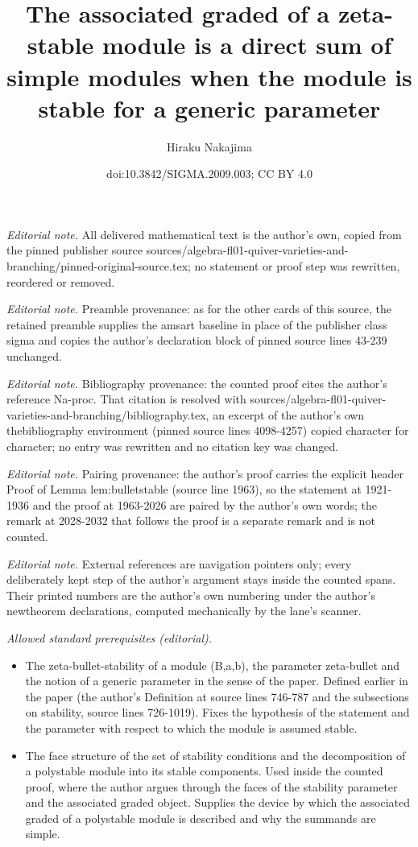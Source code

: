 \documentclass[10pt,a4paper]{amsart}
\title{The associated graded of a zeta-stable module is a direct sum of simple modules when the module is stable for a generic parameter}
\author{Hiraku Nakajima}
\date{doi:10.3842/SIGMA.2009.003; CC BY 4.0}
\theoremstyle{definition}
\numberwithin{equation}{section}
\begin{document}
\maketitle
\noindent\textit{Editorial note.} All delivered mathematical text is the author's own, copied from the pinned publisher source sources/algebra-fl01-quiver-varieties-and-branching/pinned-original-source.tex; no statement or proof step was rewritten, reordered or removed.\par\medskip
\noindent\textit{Editorial note.} Preamble provenance: as for the other cards of this source, the retained preamble supplies the amsart baseline in place of the publisher class sigma and copies the author's declaration block of pinned source lines 43-239 unchanged.\par\medskip
\noindent\textit{Editorial note.} Bibliography provenance: the counted proof cites the author's reference Na-proc. That citation is resolved with sources/algebra-fl01-quiver-varieties-and-branching/bibliography.tex, an excerpt of the author's own thebibliography environment (pinned source lines 4098-4257) copied character for character; no entry was rewritten and no citation key was changed.\par\medskip
\noindent\textit{Editorial note.} Pairing provenance: the author's proof carries the explicit header Proof of Lemma lem:bulletstable (source line 1963), so the statement at 1921-1936 and the proof at 1963-2026 are paired by the author's own words; the remark at 2028-2032 that follows the proof is a separate remark and is not counted.\par\medskip
\noindent\textit{Editorial note.} External references are navigation pointers only; every deliberately kept step of the author's argument stays inside the counted spans. Their printed numbers are the author's own numbering under the author's newtheorem declarations, computed mechanically by the lane's scanner.\par\medskip
\noindent\textit{Allowed standard prerequisites (editorial).}\begin{itemize}
\item The zeta-bullet-stability of a module (B,a,b), the parameter zeta-bullet and the notion of a generic parameter in the sense of the paper. Defined earlier in the paper (the author's Definition at source lines 746-787 and the subsections on stability, source lines 726-1019). Fixes the hypothesis of the statement and the parameter with respect to which the module is assumed stable.
\item The face structure of the set of stability conditions and the decomposition of a polystable module into its stable components. Used inside the counted proof, where the author argues through the faces of the stability parameter and the associated graded object. Supplies the device by which the associated graded of a polystable module is described and why the summands are simple.
\end{itemize}\medskip
\end{document}
